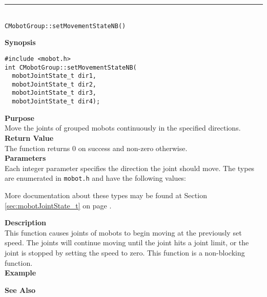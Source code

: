 \noindent
\vspace{5pt}
\rule{4.5in}{0.015in}\\
\noindent
{\LARGE \texttt{CMobotGroup::setMovementStateNB()}}\\
{}

\noindent
{\bf Synopsis}
\vspace{-8pt}
\begin{verbatim}
#include <mobot.h>
int CMobotGroup::setMovementStateNB(
  mobotJointState_t dir1, 
  mobotJointState_t dir2, 
  mobotJointState_t dir3, 
  mobotJointState_t dir4);
\end{verbatim}

\noindent
{\bf Purpose}\\
Move the joints of grouped mobots continuously in the specified directions.\\

\noindent
{\bf Return Value}\\
The function returns 0 on success and non-zero otherwise.\\

\noindent
{\bf Parameters}\\
Each integer parameter specifies the direction the joint should move. The types
are enumerated in \texttt{mobot.h} and have the following values:

More documentation about these types may be found at Section
\ref{sec:mobotJointState_t} on page
\pageref{sec:mobotJointState_t}.

\noindent
{\bf Description}\\
This function causes joints of mobots to begin moving at the previously set
speed. The joints will continue moving until the joint hits a joint limit, or
the joint is stopped by setting the speed to zero. This function is a non-blocking
function.\\

\noindent
{\bf Example}\\
\noindent

\noindent
{\bf See Also}\\

